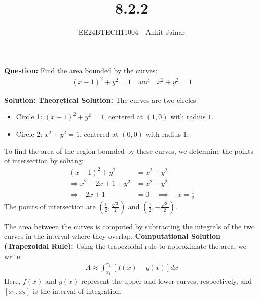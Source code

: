 \documentclass[journal]{IEEEtran}
\title{8.2.2}
\author{EE24BTECH11004 - Ankit Jainar}
\date{}
\begin{document}
\maketitle

\textbf{Question:}
Find the area bounded by the curves:
\begin{align*}
    (x - 1)^2 + y^2 = 1 \quad \text{and} \quad x^2 + y^2 = 1
\end{align*}

\textbf{Solution:}
\newline
\textbf{Theoretical Solution:}
\newline
The curves are two circles:
\begin{itemize}
    \item Circle 1: $(x - 1)^2 + y^2 = 1$, centered at $(1, 0)$ with radius $1$.
    \item Circle 2: $x^2 + y^2 = 1$, centered at $(0, 0)$ with radius $1$.
\end{itemize}

To find the area of the region bounded by these curves, we determine the points of intersection by solving:
\begin{align*}
    (x - 1)^2 + y^2 &= x^2 + y^2 \\
    \Rightarrow x^2 - 2x + 1 + y^2 &= x^2 + y^2 \\
    \Rightarrow -2x + 1 &= 0 \quad \implies \quad x = \frac{1}{2}
\end{align*}
The points of intersection are $\left(\frac{1}{2}, \frac{\sqrt{3}}{2}\right)$ and $\left(\frac{1}{2}, -\frac{\sqrt{3}}{2}\right)$.

The area between the curves is computed by subtracting the integrals of the two curves in the interval where they overlap.
\newline
\textbf{Computational Solution (Trapezoidal Rule):}
\newline
Using the trapezoidal rule to approximate the area, we write:
\begin{align*}
    A \approx \int_{x_1}^{x_2} \left[ f(x) - g(x) \right] dx
\end{align*}
Here, $f(x)$ and $g(x)$ represent the upper and lower curves, respectively, and $[x_1, x_2]$ is the interval of integration.
\end{document}
